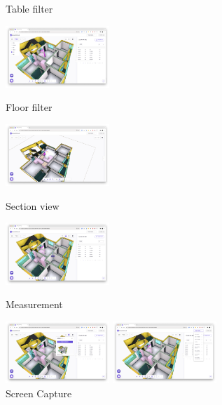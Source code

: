 \begin{itemize}[label=]
\begin{itemize}[label=]
\begin{figure}[!ht]
\begin{fullwidth}
{					            \caption*{Table filter}
				            }
				            \parbox{0.35\textwidth}{
					            \centering
					            \includegraphics[width=0.35\textwidth]{images/builderhub-curation-filter-floor.png}
					            \caption*{Floor filter}
				            }\qquad
				            \parbox{0.35\textwidth}{
					            \centering
					            \includegraphics[width=0.35\textwidth]{images/builderhub-curation-section-view.png}
					            \caption*{Section view}
				            }\qquad
				            \parbox{0.35\textwidth}{
					            \centering
					            \includegraphics[width=0.35\textwidth]{images/builderhub-curation-measurement.png}
					            \caption*{Measurement}
				            }\qquad
				            \parbox{0.35\textwidth}{
					            \centering
					            \includegraphics[width=0.35\textwidth]{images/builderhub-curation-screenshot.png}
					            \caption*{Screen Capture}
				            }
				            \parbox{0.35\textwidth}{
					            \centering
					            \includegraphics[width=0.35\textwidth]{images/builderhub-curation-download.png}
}
\end{fullwidth}
\end{figure}
\end{itemize}
\end{itemize}

